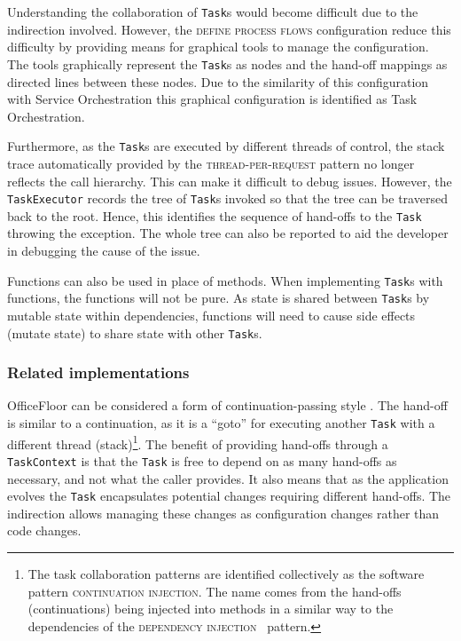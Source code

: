 \documentclass[prodmode]{style/acmlarge}
\begin{document}
Understanding the collaboration of \texttt{Task}s would become difficult due to
the indirection involved.  However, the \textsc{define process flows}
configuration reduce this difficulty by providing means for graphical tools to
manage the configuration.  The tools graphically represent the \texttt{Task}s as
nodes and the hand-off mappings as directed lines between these nodes.  Due to
the similarity of this configuration with Service Orchestration this graphical
configuration is identified as Task Orchestration.

Furthermore, as the \texttt{Task}s are executed by different threads of control,
the stack trace automatically provided by the \textsc{thread-per-request}
pattern no longer reflects the call hierarchy.  This can make it difficult to
debug issues.  However, the \texttt{TaskExecutor} records the tree of
\texttt{Task}s invoked so that the tree can be traversed back to the root.
Hence, this identifies the sequence of hand-offs to the \texttt{Task} throwing
the exception.  The whole tree can also be reported to aid the developer in
debugging the cause of the issue.

Functions can also be used in place of methods.  When implementing
\texttt{Task}s with functions, the functions will not be pure.  As state is
shared between \texttt{Task}s by mutable state within dependencies, functions
will need to cause side effects (mutate state) to share state with other
\texttt{Task}s.



\subsubsection*{Related implementations}

OfficeFloor can be considered a form of continuation-passing style
\cite{continuations}.  The hand-off is similar to a continuation, as it is a
``goto'' for executing another \texttt{Task} with a different thread
(stack)\footnote{The task collaboration patterns are identified collectively as
the software pattern \textsc{continuation injection}.  The name comes from the
hand-offs (continuations) being injected into methods in a similar way to the
dependencies of the \textsc{dependency injection}~\cite{ioc} pattern.}.  The
benefit of providing hand-offs through a \texttt{TaskContext} is that the
\texttt{Task} is free to depend on as many hand-offs as necessary, and not what
the caller provides.  It also means that as the application evolves the
\texttt{Task} encapsulates potential changes requiring different hand-offs.  The
indirection allows managing these changes as configuration changes rather than
code changes.
\end{document}
